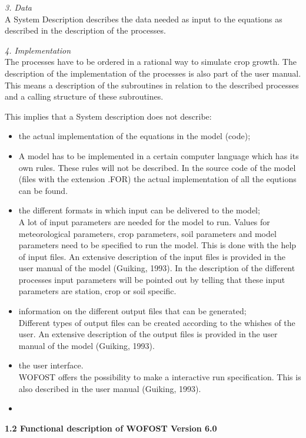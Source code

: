 {\it 3. Data\/}\\
A System Description describes the data needed as input to the equations as
described in the description of the processes. 

{\it 4. Implementation\/}\\
The processes have to be ordered in a rational way to simulate crop growth. The
description of the implementation of the processes is also part of the user manual.
This means a description of the subroutines in relation to the described processes and
a calling structure of these subroutines.  

This implies that a System description does not describe:
\begin{itemize}
\item the actual implementation of the equations in the model (code);
\item A model has to be implemented in a certain computer language which has its
own rules. These rules will not be described. In the source code of the model 
(files with the extension .FOR) the actual implementation of all the equtions
can be found.
\item the different formats in which input can be delivered to the model;\\
A lot of input parameters are needed for the model to run. Values for
meteorological parameters, crop parameters, soil parameters and model
parameters need to be specified to run the model. This is done with the help
of input files. An extensive description of the input files is provided in the user
manual of the model (Guiking, 1993). In the description of the different
processes input parameters will be pointed out by telling that these input
parameters are station, crop or soil specific.   
\item information on the different output files that can be generated;\\
Different types of output files can be created according to the whishes of the
user. An extensive description of the output files is provided in the user
manual of the model (Guiking, 1993).
\item the user interface. \\
WOFOST offers the possibility to make a interactive run specification. This is
also described in the user manual (Guiking, 1993).

\item 
\end{itemize}

{\bf 1.2 Functional description of WOFOST Version 6.0}

